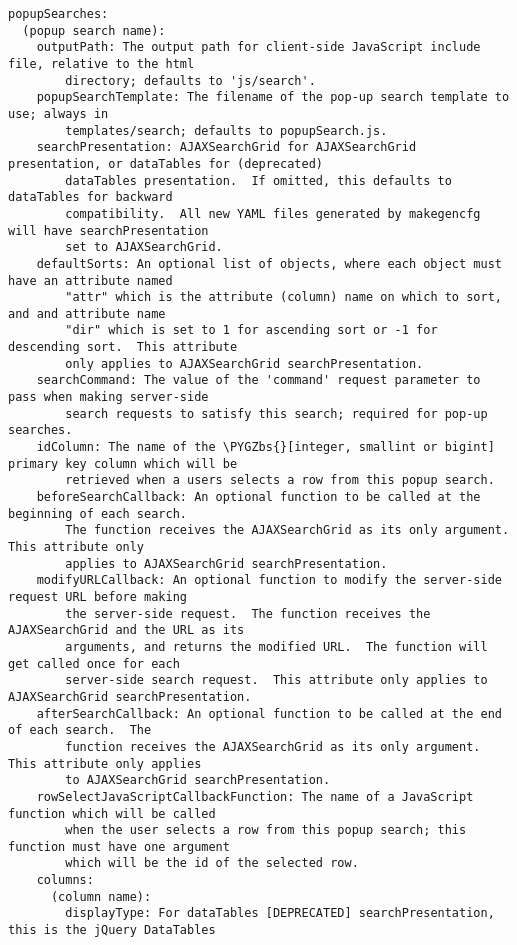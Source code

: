 \documentclass[letterpaper,10pt,english]{sphinxmanual}
\def\PYGZbs{\char`\\}
\begin{document}
\begin{Verbatim}[commandchars=\\\{\}]
popupSearches:
  (popup search name):
    outputPath: The output path for client-side JavaScript include file, relative to the html
        directory; defaults to 'js/search'.
    popupSearchTemplate: The filename of the pop-up search template to use; always in
        templates/search; defaults to popupSearch.js.
    searchPresentation: AJAXSearchGrid for AJAXSearchGrid presentation, or dataTables for (deprecated)
        dataTables presentation.  If omitted, this defaults to dataTables for backward
        compatibility.  All new YAML files generated by makegencfg will have searchPresentation
        set to AJAXSearchGrid.
    defaultSorts: An optional list of objects, where each object must have an attribute named
        "attr" which is the attribute (column) name on which to sort, and and attribute name
        "dir" which is set to 1 for ascending sort or -1 for descending sort.  This attribute
        only applies to AJAXSearchGrid searchPresentation.
    searchCommand: The value of the 'command' request parameter to pass when making server-side
        search requests to satisfy this search; required for pop-up searches.
    idColumn: The name of the \PYGZbs{}[integer, smallint or bigint] primary key column which will be
        retrieved when a users selects a row from this popup search.
    beforeSearchCallback: An optional function to be called at the beginning of each search.
        The function receives the AJAXSearchGrid as its only argument.  This attribute only
        applies to AJAXSearchGrid searchPresentation.
    modifyURLCallback: An optional function to modify the server-side request URL before making
        the server-side request.  The function receives the AJAXSearchGrid and the URL as its
        arguments, and returns the modified URL.  The function will get called once for each
        server-side search request.  This attribute only applies to AJAXSearchGrid searchPresentation.
    afterSearchCallback: An optional function to be called at the end of each search.  The
        function receives the AJAXSearchGrid as its only argument.  This attribute only applies
        to AJAXSearchGrid searchPresentation.
    rowSelectJavaScriptCallbackFunction: The name of a JavaScript function which will be called
        when the user selects a row from this popup search; this function must have one argument
        which will be the id of the selected row.
    columns:
      (column name):
        displayType: For dataTables [DEPRECATED] searchPresentation, this is the jQuery DataTables

\end{Verbatim}
\end{document}
